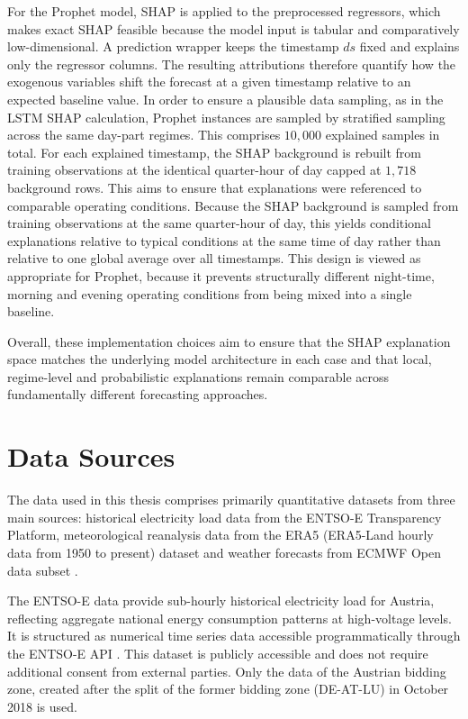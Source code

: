 \documentclass[Master,english,IEEE]{twbook}
\begin{document}
For the Prophet model, SHAP is applied to the preprocessed regressors, which makes exact SHAP feasible because the model input is tabular and comparatively low-dimensional. A prediction wrapper keeps the timestamp $ds$ fixed and explains only the regressor columns. The resulting attributions therefore quantify how the exogenous variables shift the forecast at a given timestamp relative to an expected baseline value. In order to ensure a plausible data sampling, as in the LSTM SHAP calculation, Prophet instances are sampled by stratified sampling across the same day-part regimes. This comprises $10{,}000$ explained samples in total. For each explained timestamp, the SHAP background is rebuilt from training observations at the identical quarter-hour of day capped at $1{,}718$ background rows. This aims to ensure that explanations were referenced to comparable operating conditions. Because the SHAP background is sampled from training observations at the same quarter-hour of day, this yields conditional explanations relative to typical conditions at the same time of day rather than relative to one global average over all timestamps. This design is viewed as appropriate for Prophet, because it prevents structurally different night-time, morning and evening operating conditions from being mixed into a single baseline. 

Overall, these implementation choices aim to ensure that the SHAP explanation space matches the underlying model architecture in each case and that local, regime-level and probabilistic explanations remain comparable across fundamentally different forecasting approaches.


\section{Data Sources}
The data used in this thesis comprises primarily quantitative datasets from three main sources: historical electricity load data from the ENTSO-E Transparency Platform, meteorological reanalysis data from the ERA5 (ERA5-Land hourly data from 1950 to present) \cite{ERA5LandHourlyData} dataset and weather forecasts from ECMWF Open data subset \cite{OpenData2021}.

The ENTSO-E data provide sub-hourly historical electricity load for Austria, reflecting aggregate national energy consumption patterns at high-voltage levels. It is structured as numerical time series data accessible programmatically through the ENTSO-E API \cite{TransparencyPlatformRestful}. This dataset is publicly accessible and does not require additional consent from external parties. Only the data of the Austrian bidding zone, created after the split of the former bidding zone (DE-AT-LU) in October 2018 is used.
\end{document}
